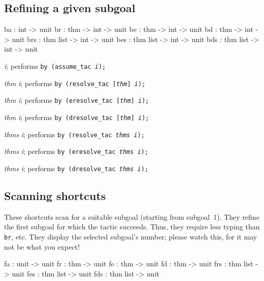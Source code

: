 \subsection{Refining a given subgoal}
\begin{ttbox} 
ba  :             int -> unit
br  : thm      -> int -> unit
be  : thm      -> int -> unit
bd  : thm      -> int -> unit
brs : thm list -> int -> unit
bes : thm list -> int -> unit
bds : thm list -> int -> unit
\end{ttbox}

\begin{ttdescription}
\item[\ttindexbold{ba} {\it i};] 
performs \texttt{by (assume_tac {\it i});}

\item[\ttindexbold{br} {\it thm} {\it i};] 
performs \texttt{by (resolve_tac [{\it thm}] {\it i});}

\item[\ttindexbold{be} {\it thm} {\it i};] 
performs \texttt{by (eresolve_tac [{\it thm}] {\it i});}

\item[\ttindexbold{bd} {\it thm} {\it i};] 
performs \texttt{by (dresolve_tac [{\it thm}] {\it i});}

\item[\ttindexbold{brs} {\it thms} {\it i};] 
performs \texttt{by (resolve_tac {\it thms} {\it i});}

\item[\ttindexbold{bes} {\it thms} {\it i};] 
performs \texttt{by (eresolve_tac {\it thms} {\it i});}

\item[\ttindexbold{bds} {\it thms} {\it i};] 
performs \texttt{by (dresolve_tac {\it thms} {\it i});}
\end{ttdescription}


\subsection{Scanning shortcuts}
These shortcuts scan for a suitable subgoal (starting from subgoal~1).
They refine the first subgoal for which the tactic succeeds.  Thus, they
require less typing than \texttt{br}, etc.  They display the selected
subgoal's number; please watch this, for it may not be what you expect!

\begin{ttbox} 
fa  : unit     -> unit
fr  : thm      -> unit
fe  : thm      -> unit
fd  : thm      -> unit
frs : thm list -> unit
fes : thm list -> unit
fds : thm list -> unit
\end{ttbox}

